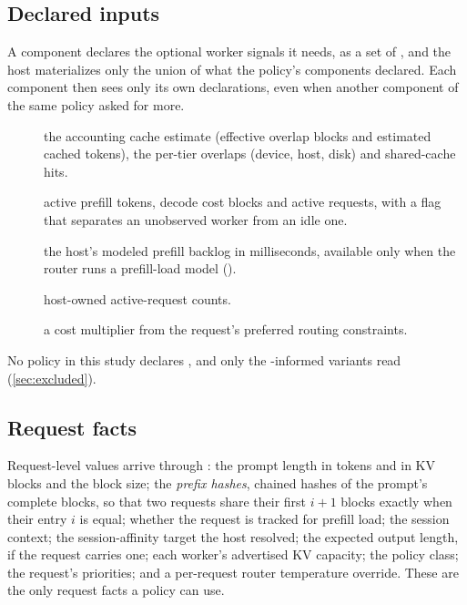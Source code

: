 \subsection{Declared inputs}

A component declares the optional worker signals it needs, as a set of , and the
host materializes only the union of what the policy's components declared. Each component then sees
only its own declarations, even when another component of the same policy asked for more.
\begin{description}
  \item[] the accounting cache estimate (effective overlap blocks and estimated cached
    tokens), the per-tier overlaps (device, host, disk) and shared-cache hits.
  \item[] active prefill tokens, decode cost blocks and active requests, with a flag
    that separates an unobserved worker from an idle one.
  \item[] the host's modeled prefill backlog in milliseconds, available only when
    the router runs a prefill-load model ().
  \item[] host-owned active-request counts.
  \item[] a cost multiplier from the request's preferred routing constraints.
\end{description}
No policy in this study declares , and only the \ais{}-informed variants read
 (\cref{sec:excluded}).

\subsection{Request facts}

Request-level values arrive through : the prompt length in tokens and
in KV blocks and the block size; the \emph{prefix hashes}, chained hashes of the prompt's complete
blocks, so that two requests share their first $i+1$ blocks exactly when their entry $i$ is equal;
whether the request is tracked for prefill load; the session context; the session-affinity target
the host resolved; the expected output length, if the request carries one; each worker's
advertised KV capacity; the policy class; the request's priorities; and a per-request router
temperature override. These are the only request facts a policy can use.

